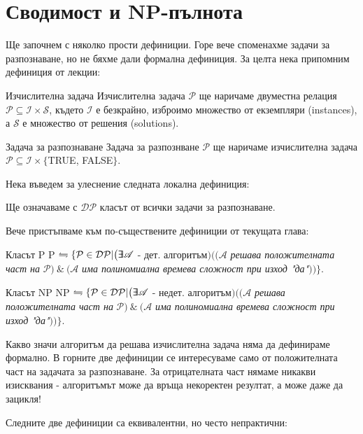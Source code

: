 \section{Сводимост и NP-пълнота}

Ще започнем с няколко прости дефиниции. Горе вече споменахме задачи за разпознаване, но не бяхме дали формална дефиниция. За целта нека припомним дефиниция от лекции:

\begin{boxdefinition}{Изчислителна задача}{}
	Изчислителна задача $\mathcal{P}$ ще наричаме двуместна релация $\mathcal{P}\subseteq\mathcal{I}\times\mathcal{S}$, където $\mathcal{I}$ е безкрайно, изброимо множество от екземпляри (instances), а $\mathcal{S}$ е множество от решения (solutions).
\end{boxdefinition}
\begin{boxdefinition}{Задача за разпознаване}{}
	Задача за разпознване $\mathcal{P}$ ще наричаме изчислителна задача $\mathcal{P}\subseteq\mathcal{I}\times\{$TRUE, FALSE$\}$.
\end{boxdefinition}
\noindent
Нека въведем за улеснение следната локална дефиниция:
\begin{boxlocaldefinition*}{}{}
	Ще означаваме с $\mathcal{DP}$ класът от всички задачи за разпознаване.
\end{boxlocaldefinition*}
\noindent
Вече пристъпваме към по-съществените дефиниции от текущата глава:
\begin{boxdefinition}{Класът P}{}
	P $\leftrightharpoons\{\mathcal{P}\in\mathcal{DP}|\big(\doubleexists\mathscr{A}$ - дет. алгоритъм$\big)\big((\mathscr{A}$ \emph{решава положителната част на} $\mathcal{P})\ \&\ (\mathscr{A}$ \emph{има полиномиална времева сложност при изход "да"}$)\big)\}$.
\end{boxdefinition}
\begin{boxdefinition}{Класът NP}{}
	NP $\leftrightharpoons\{\mathcal{P}\in\mathcal{DP}|\big(\doubleexists\mathscr{A}$ - недет. алгоритъм$\big)\big((\mathscr{A}$ \emph{решава положителната част на} $\mathcal{P})\ \&\ (\mathscr{A}$ \emph{има полиномиална времева сложност при изход "да"}$)\big)\}$.
\end{boxdefinition}
\begin{remark*}
	Какво значи алгоритъм да решава изчислителна задача няма да дефинираме формално. В горните две дефиниции се интересуваме само от положителната част на задачата за разпознаване. За отрицателната част нямаме никакви изисквания - алгоритъмът може да връща некоректен резултат, а може даже да зацикля!
\end{remark*}
\noindent
Следните две дефиниции са еквивалентни, но често непрактични:

